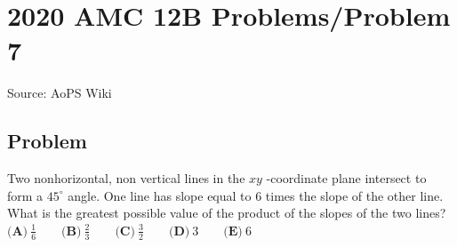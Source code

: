 \documentclass[12pt]{article}
\begin{document}
\section*{{2020 AMC 12B Problems/Problem 7}}
Source: AoPS Wiki

\subsection*{Problem}
Two nonhorizontal, non vertical lines in the $xy$ -coordinate plane intersect to form a $45^{\circ}$ angle. One line has slope equal to $6$ times the slope of the other line. What is the greatest possible value of the product of the slopes of the two lines? $\textbf{(A)}\ \frac16 \qquad\textbf{(B)}\ \frac23 \qquad\textbf{(C)}\ \frac32 \qquad\textbf{(D)}\ 3 \qquad\textbf{(E)}\ 6$
\end{document}
